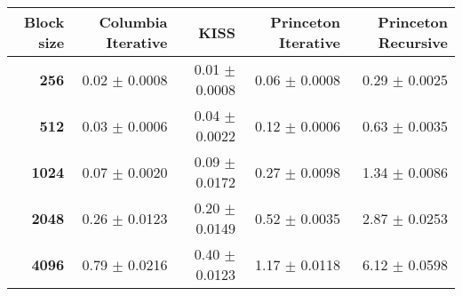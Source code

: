 \begin{tabular}{rrrrr}\toprule
\textbf{Block size}  & \textbf{Columbia Iterative} & \textbf{KISS} & \textbf{Princeton Iterative} & \textbf{Princeton Recursive}\\\midrule
\textbf{256}  & 0.02 $\pm$ 0.0008 & 0.01 $\pm$ 0.0008 & 0.06 $\pm$ 0.0008 & 0.29 $\pm$ 0.0025\\
\textbf{512}  & 0.03 $\pm$ 0.0006 & 0.04 $\pm$ 0.0022 & 0.12 $\pm$ 0.0006 & 0.63 $\pm$ 0.0035\\
\textbf{1024}  & 0.07 $\pm$ 0.0020 & 0.09 $\pm$ 0.0172 & 0.27 $\pm$ 0.0098 & 1.34 $\pm$ 0.0086\\
\textbf{2048}  & 0.26 $\pm$ 0.0123 & 0.20 $\pm$ 0.0149 & 0.52 $\pm$ 0.0035 & 2.87 $\pm$ 0.0253\\
\textbf{4096} & 0.79 $\pm$ 0.0216 & 0.40 $\pm$ 0.0123 & 1.17 $\pm$ 0.0118 & 6.12 $\pm$ 0.0598\\
\bottomrule
\end{tabular}
